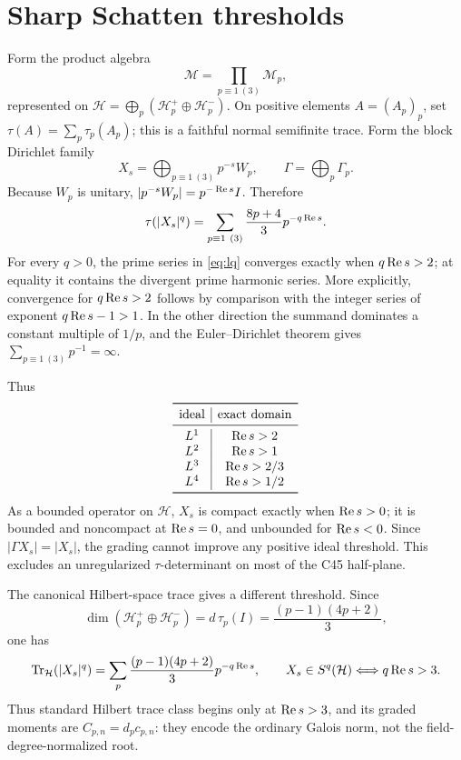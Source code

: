 \section{Sharp Schatten thresholds}

Form the product algebra
\[
 \mathcal M=\prod_{p\equiv1\ (3)}\mathcal M_p,
\]
represented on
$\mathcal H=\bigoplus_p(\mathcal H_p^+\oplus\mathcal H_p^-)$.  On positive
elements $A=(A_p)_p$, set $\tau(A)=\sum_p\tau_p(A_p)$; this is a faithful
normal semifinite trace.  Form the block Dirichlet family
\[
 X_s=\bigoplus_{p\equiv1\ (3)}p^{-s}W_p,
 \qquad \Gamma=\bigoplus_p\Gamma_p.
\]
Because $W_p$ is unitary, $|p^{-s}W_p|=p^{-\operatorname{Re} s}I$.  Therefore
\begin{equation}\label{eq:lq}
 \tau(|X_s|^q)
 =\sum_{p\equiv1\ (3)}\frac{8p+4}{3}p^{-q\operatorname{Re} s}.
\end{equation}
For every $q>0$, the prime series in \eqref{eq:lq} converges exactly when
$q\operatorname{Re} s>2$; at equality it contains the divergent prime harmonic series.
More explicitly, convergence for $q\operatorname{Re} s>2$ follows by comparison with
the integer series of exponent $q\operatorname{Re} s-1>1$.  In the other direction the
summand dominates a constant multiple of $1/p$, and the Euler--Dirichlet
theorem gives $\sum_{p\equiv1\ (3)}p^{-1}=\infty$.

Thus
\[
\begin{array}{c|c}
\toprule
\text{ideal}&\text{exact domain}\\
\midrule
L^1&\RePart s>2\\
L^2&\RePart s>1\\
L^3&\RePart s>2/3\\
L^4&\RePart s>1/2\\
\bottomrule
\end{array}
\]
As a bounded operator on $\mathcal H$, $X_s$ is compact exactly when
$\operatorname{Re} s>0$; it is bounded and noncompact at $\operatorname{Re} s=0$, and unbounded
for $\operatorname{Re} s<0$.  Since $|\Gamma X_s|=|X_s|$, the grading cannot improve
any positive ideal threshold.  This excludes an unregularized
$\tau$-determinant on most of the C45 half-plane.

The canonical Hilbert-space trace gives a different threshold.  Since
\[
 \dim(\mathcal H_p^+\oplus\mathcal H_p^-)
 =d\,\tau_p(I)=\frac{(p-1)(4p+2)}3,
\]
one has
\[
 \operatorname{Tr}_{\mathcal H}(|X_s|^q)
 =\sum_p\frac{(p-1)(4p+2)}3p^{-q\operatorname{Re} s},
 \qquad X_s\in S^q(\mathcal H)\Longleftrightarrow q\operatorname{Re} s>3.
\]
Thus standard Hilbert trace class begins only at $\operatorname{Re} s>3$, and its
graded moments are $C_{p,n}=d_pc_{p,n}$: they encode the ordinary Galois norm,
not the field-degree-normalized root.
